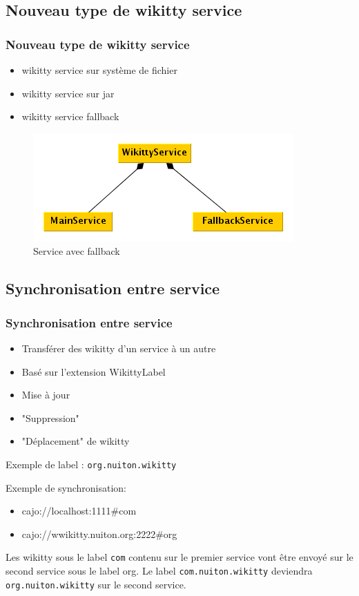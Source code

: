 \documentclass[12pt,a4paper,utf8x]{beamer}
\begin{document}
\subsection*{Nouveau type de wikitty service}
\begin{frame}\frametitle{Nouveau type de wikitty service}
\begin{itemize}
\item wikitty service sur système de fichier
\item wikitty service sur jar
\item wikitty service fallback\pause
\end{itemize}\pause
\begin{figure}
\includegraphics[scale=0.5]{../image/multicontext.png} 
\caption{Service avec fallback}
\end{figure}
\end{frame}



\subsection*{Synchronisation entre service}
\begin{frame}\frametitle{Synchronisation entre service}
\begin{itemize}
\item Transférer des wikitty d'un service à un autre
\item Basé sur l'extension WikittyLabel
\item Mise à jour
\item "Suppression"
\item "Déplacement" de wikitty
\end{itemize}
\pause
Exemple de label :
\verb!org.nuiton.wikitty!
\end{frame}

\begin{frame}
Exemple de synchronisation:
\begin{itemize}
\item cajo://localhost:1111\#com
\item cajo://wwikitty.nuiton.org:2222\#org
\end{itemize}
\vspace{5mm}
Les wikitty sous le label \verb!com! contenu sur le premier service vont
être envoyé sur le second service sous le label org.
\vspace{5mm}
Le label \verb!com.nuiton.wikitty! deviendra \verb!org.nuiton.wikitty! sur 
le second service.
\end{frame}
\end{document}
